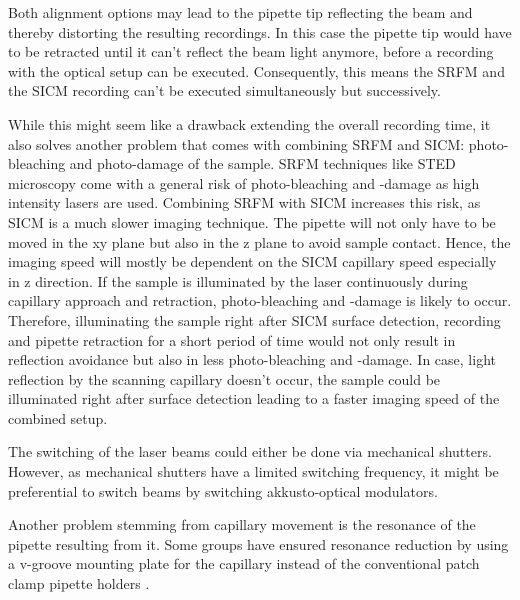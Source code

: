 Both alignment options may lead to the pipette tip reflecting the beam and
thereby distorting the resulting recordings. In this case the pipette tip
would have to be retracted until it can't reflect the beam light anymore,
before a recording with the optical setup can be executed. Consequently, this
means the SRFM and the SICM recording can't be executed simultaneously but
successively.

While this might seem like a drawback extending the overall recording time, it
also solves another problem that comes with combining SRFM and SICM:
photo-bleaching and photo-damage of the sample. SRFM techniques like STED
microscopy come with a general risk of photo-bleaching and -damage as high
intensity lasers are used. Combining SRFM with SICM increases this risk,
as SICM is a much slower imaging technique. The pipette will not only have to
be moved in the xy plane but also in the z plane to avoid sample
contact. Hence, the imaging speed will mostly be dependent on the SICM
capillary speed especially in z direction. If the sample is illuminated by the
laser continuously during capillary approach and retraction, photo-bleaching
and -damage is likely to occur. Therefore, illuminating the sample right after
SICM surface detection, recording and pipette retraction for a short period of
time would not only result in reflection avoidance but also in less
photo-bleaching and -damage. In case, light reflection by the scanning
capillary doesn't occur, the sample could be illuminated right after surface
detection leading to a faster imaging speed of the combined setup.

The switching of the laser beams could either be done via mechanical
shutters. However, as mechanical shutters have a limited switching frequency,
it might be preferential to switch beams by switching akkusto-optical modulators.

Another problem stemming from capillary movement is the resonance of the
pipette resulting from it. Some groups have ensured resonance reduction by
using a v-groove mounting plate for the capillary instead of the conventional
patch clamp pipette holders \cite{Shevchuk2013}.

 	

